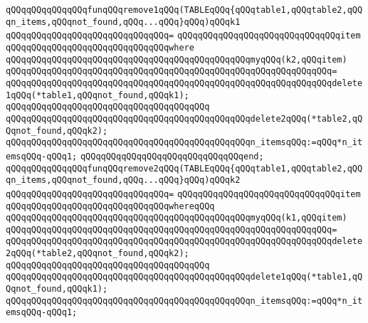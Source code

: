 \newline
\verb|qQQqqQQqqQQqqQQqfunqQQqremove1qQQq(TABLEqQQq{qQQqtable1,qQQqtable2,qQQqn_items,qQQqnot_found,qQQq...qQQq}qQQq)qQQqk1|\newline
\verb|qQQqqQQqqQQqqQQqqQQqqQQqqQQqqQQq=|\newline
\verb|qQQqqQQqqQQqqQQqqQQqqQQqqQQqqQQqitem|\newline
\verb|qQQqqQQqqQQqqQQqqQQqqQQqqQQqqQQqwhere|\newline
\verb|qQQqqQQqqQQqqQQqqQQqqQQqqQQqqQQqqQQqqQQqqQQqqQQqmyqQQq(k2,qQQqitem)|\newline
\verb|qQQqqQQqqQQqqQQqqQQqqQQqqQQqqQQqqQQqqQQqqQQqqQQqqQQqqQQqqQQqqQQq=|\newline
\verb|qQQqqQQqqQQqqQQqqQQqqQQqqQQqqQQqqQQqqQQqqQQqqQQqqQQqqQQqqQQqqQQqdelete1qQQq(*table1,qQQqnot_found,qQQqk1);|\newline
\verb|qQQqqQQqqQQqqQQqqQQqqQQqqQQqqQQqqQQqqQQq|\newline
\verb|qQQqqQQqqQQqqQQqqQQqqQQqqQQqqQQqqQQqqQQqqQQqqQQqdelete2qQQq(*table2,qQQqnot_found,qQQqk2);|\newline
\verb|qQQqqQQqqQQqqQQqqQQqqQQqqQQqqQQqqQQqqQQqqQQqqQQqn_itemsqQQq:=qQQq*n_itemsqQQq-qQQq1;|\newline
\verb|qQQqqQQqqQQqqQQqqQQqqQQqqQQqqQQqend;|\newline
\newline
\verb|qQQqqQQqqQQqqQQqfunqQQqremove2qQQq(TABLEqQQq{qQQqtable1,qQQqtable2,qQQqn_items,qQQqnot_found,qQQq...qQQq}qQQq)qQQqk2|\newline
\verb|qQQqqQQqqQQqqQQqqQQqqQQqqQQqqQQq=|\newline
\verb|qQQqqQQqqQQqqQQqqQQqqQQqqQQqqQQqitem|\newline
\verb|qQQqqQQqqQQqqQQqqQQqqQQqqQQqqQQqwhereqQQq|\newline
\verb|qQQqqQQqqQQqqQQqqQQqqQQqqQQqqQQqqQQqqQQqqQQqqQQqmyqQQq(k1,qQQqitem)|\newline
\verb|qQQqqQQqqQQqqQQqqQQqqQQqqQQqqQQqqQQqqQQqqQQqqQQqqQQqqQQqqQQqqQQq=|\newline
\verb|qQQqqQQqqQQqqQQqqQQqqQQqqQQqqQQqqQQqqQQqqQQqqQQqqQQqqQQqqQQqqQQqdelete2qQQq(*table2,qQQqnot_found,qQQqk2);|\newline
\verb|qQQqqQQqqQQqqQQqqQQqqQQqqQQqqQQqqQQqqQQq|\newline
\verb|qQQqqQQqqQQqqQQqqQQqqQQqqQQqqQQqqQQqqQQqqQQqqQQqdelete1qQQq(*table1,qQQqnot_found,qQQqk1);|\newline
\newline
\verb|qQQqqQQqqQQqqQQqqQQqqQQqqQQqqQQqqQQqqQQqqQQqqQQqn_itemsqQQq:=qQQq*n_itemsqQQq-qQQq1;|\newline
